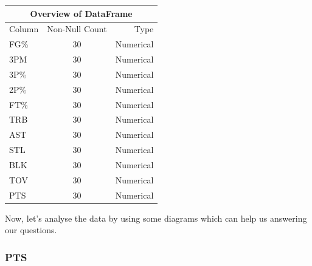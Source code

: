 \documentclass[conference]{IEEEtran}
\begin{document}
\vspace{\baselineskip}

\vspace{\baselineskip}

\begin{tabular}{|l||c|r|}
    \hline
    \multicolumn{3}{|c|}{Overview of DataFrame} \\
    \hline
    Column & Non-Null Count & Type \\
    \hline

    FG\% & 30 & Numerical \\
    3PM & 30 & Numerical \\
    3P\% & 30 & Numerical \\
    2P\% & 30 & Numerical \\
    FT\% & 30 & Numerical \\
    TRB & 30 & Numerical \\
    AST & 30 & Numerical \\
    STL & 30 & Numerical \\
    BLK & 30 & Numerical \\
    TOV & 30 & Numerical \\
    PTS & 30 & Numerical \\
    \hline
\end{tabular}

\vspace{\baselineskip}
\vspace{\baselineskip}
Now, let's analyse the data by using some diagrams which can help us answering our questions.

\vspace{\baselineskip}
\vspace{\baselineskip}
\vspace{\baselineskip}
\vspace{\baselineskip}
\vspace{\baselineskip}


\subsubsection{PTS}
\end{document}
